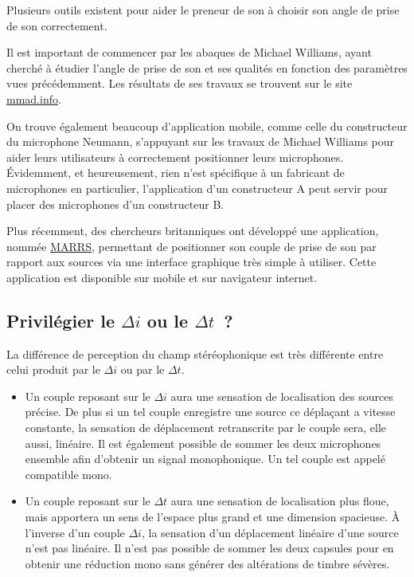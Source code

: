 \documentclass[
  letterpaper,
  DIV=11,
  numbers=noendperiod]{scrreprt}
\providecommand{\tightlist}{%
  \setlength{\itemsep}{0pt}\setlength{\parskip}{0pt}}\usepackage{longtable,booktabs,array}
\begin{document}
Plusieurs outils existent pour aider le preneur de son à choisir son
angle de prise de son correctement.

Il est important de commencer par les abaques de Michael Williams, ayant
cherché à étudier l'angle de prise de son et ses qualités en fonction
des paramètres vues précédemment. Les résultats de ses travaux se
trouvent sur le site
\href{https://www.mmad.info/MAD/2\%20Ch/2ch.htm}{mmad.info}.

On trouve également beaucoup d'application mobile, comme celle du
constructeur du microphone Neumann, s'appuyant sur les travaux de
Michael Williams pour aider leurs utilisateurs à correctement
positionner leurs microphones. Évidemment, et heureusement, rien n'est
spécifique à un fabricant de microphones en particulier, l'application
d'un constructeur A peut servir pour placer des microphones d'un
constructeur B.

Plus récemment, des chercheurs britanniques ont développé une
application, nommée \href{https://marrsweb.hud.ac.uk/}{MARRS},
permettant de positionner son couple de prise de son par rapport aux
sources via une interface graphique très simple à utiliser. Cette
application est disponible sur mobile et sur navigateur internet.

\hypertarget{priviluxe9gier-le-delta-i-ou-le-delta-t}{%
\subsection{\texorpdfstring{Privilégier le \(\Delta i\) ou le
\(\Delta t\)~?}{Privilégier le \textbackslash Delta i ou le \textbackslash Delta t~?}}\label{priviluxe9gier-le-delta-i-ou-le-delta-t}}

La différence de perception du champ stéréophonique est très différente
entre celui produit par le \(\Delta i\) ou par le \(\Delta t\).

\begin{itemize}
\tightlist
\item
  Un couple reposant sur le \(\Delta i\) aura une sensation de
  localisation des sources précise. De plus si un tel couple enregistre
  une source ce déplaçant a vitesse constante, la sensation de
  déplacement retranscrite par le couple sera, elle aussi, linéaire. Il
  est également possible de sommer les deux microphones ensemble afin
  d'obtenir un signal monophonique. Un tel couple est appelé compatible
  mono.
\item
  Un couple reposant sur le \(\Delta t\) aura une sensation de
  localisation plus floue, mais apportera un sens de l'espace plus grand
  et une dimension spacieuse. À l'inverse d'un couple \(\Delta i\), la
  sensation d'un déplacement linéaire d'une source n'est pas linéaire.
  Il n'est pas possible de sommer les deux capsules pour en obtenir une
  réduction mono sans générer des altérations de timbre sévères.
\end{itemize}
\end{document}
